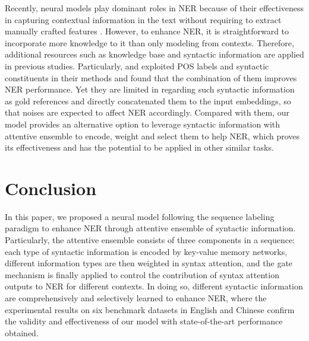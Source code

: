 \documentclass[11pt,a4paper]{article}
\begin{document}
Recently, neural models play dominant roles in NER because of their effectiveness in capturing contextual information in the text without requiring to extract manually crafted features 
\cite{DBLP:journals/corr/HuangXY15,DBLP:conf/naacl/LampleBSKD16,DBLP:conf/emnlp/StrubellVBM17,DBLP:conf/acl/ZhangY18,DBLP:conf/naacl/PetersNIGCLZ18,DBLP:conf/coling/YadavB18,DBLP:conf/tlt/CetoliBOS18,DBLP:conf/coling/AkbikBV18,DBLP:conf/naacl/AkbikBV19,DBLP:conf/aaai/ChenLDLZK19,DBLP:conf/naacl/DevlinCLT19,DBLP:conf/naacl/ZhuW19,DBLP:conf/acl/LiuYL19,DBLP:conf/emnlp/BaevskiELZA19,DBLP:journals/corr/abs-1911-04474,DBLP:conf/cikm/XuWHL19,DBLP:journals/access/ZhuHFX20,DBLP:conf/aaai/LuoXZ20}.
However, to enhance NER, it is straightforward to incorporate more knowledge to it than only modeling from contexts.
Therefore,
additional resources such as knowledge base \cite{DBLP:conf/acl/KazamaT08,DBLP:conf/konvens/TkachenkoS12,DBLP:conf/acl/SeylerDCHW18,DBLP:conf/acl/LiuYL19,DBLP:conf/naacl/LiuDS19,DBLP:conf/emnlp/GuiZZPFWH19,DBLP:conf/ijcai/GuiM0ZJH19} and syntactic information 
\cite{DBLP:conf/uai/McCallum03,mohit2005syntax,DBLP:conf/naacl/FinkelM09,DBLP:conf/emnlp/LiDWCM17,DBLP:journals/bioinformatics/LuoYYZWLW18,DBLP:conf/tlt/CetoliBOS18,DBLP:conf/emnlp/JieL19} are applied in previous studies.
Particularly,
 and  exploited POS labels and syntactic constituents in their methods and found that the combination of them improves NER performance.
Yet they are limited in regarding such syntactic information as gold references and directly concatenated them to the input embeddings, so that noises are expected to affect NER accordingly.
Compared with them, our model provides an alternative option to leverage syntactic information with attentive ensemble to encode, weight and select them to help NER, which proves its effectiveness and has the potential to be applied in other similar tasks.




\section{Conclusion}
\label{conclu}


In this paper, we proposed a neural model following the sequence labeling paradigm to enhance NER through attentive ensemble of syntactic information.
Particularly, the attentive ensemble consists of three components in a sequence:
each type of syntactic information is encoded by key-value memory networks,
different information types are then weighted in syntax attention,
and the gate mechanism is finally applied to control the contribution of syntax attention outputs to NER for different contexts.
In doing so, different syntactic information are comprehensively and selectively learned to enhance NER, where the experimental results on six benchmark datasets in English and Chinese confirm the validity and effectiveness of our model with state-of-the-art performance obtained.
\end{document}
